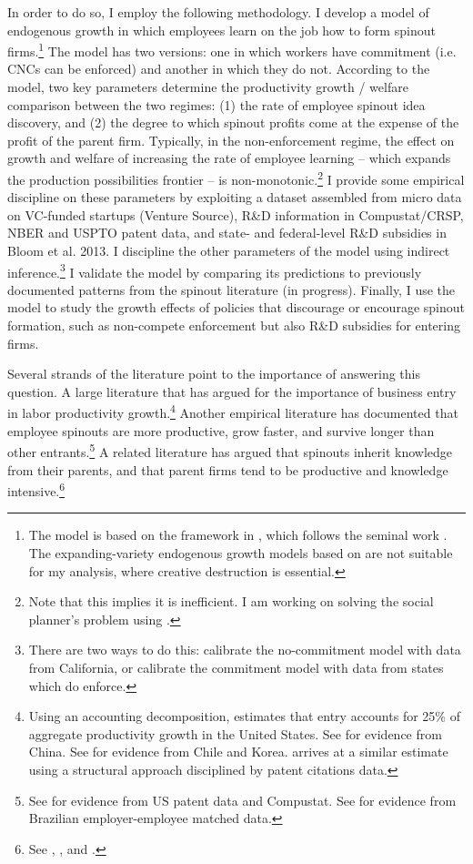\documentclass[12pt,english]{article}
\theoremstyle{remark}
\begin{document}
In order to do so, I employ the following methodology. I develop a model of endogenous growth in which employees learn on the job how to form spinout firms.\footnote{The model is based on the framework in \cite{akcigit_growth_2018}, which follows the seminal work \cite{grossman_quality_1991}. The expanding-variety endogenous growth models based on \cite{romer_increasing_1986} are not suitable for my analysis, where creative destruction is essential.} The model has two versions: one in which workers have commitment (i.e. CNCs can be enforced) and another in which they do not. According to the model, two key parameters determine the productivity growth / welfare comparison between the two regimes: (1) the rate of employee spinout idea discovery, and (2) the degree to which spinout profits come at the expense of the profit of the parent firm. Typically, in the non-enforcement regime, the effect on growth and welfare of increasing the rate of employee learning -- which expands the production possibilities frontier -- is non-monotonic.\footnote{Note that this implies it is inefficient. I am working on solving the social planner's problem using \cite{nuno_social_2018}.} I provide some empirical discipline on these parameters by exploiting a dataset assembled from micro data on VC-funded startups (Venture Source), R\&D information in Compustat/CRSP, NBER and USPTO patent data, and state- and federal-level R\&D subsidies in Bloom et al. 2013. I discipline the other parameters of the model using indirect inference.\footnote{There are two ways to do this: calibrate the no-commitment model with data from California, or calibrate the commitment model with data from states which do enforce.} I validate the model by comparing its predictions to previously documented patterns from the spinout literature (in progress). Finally, I use the model to study the growth effects of policies that discourage or encourage spinout formation, such as non-compete enforcement but also R\&D subsidies for entering firms.

Several strands of the literature point to the importance of answering this question. A large literature that has argued for the importance of business entry in labor productivity growth.\footnote{Using an accounting decomposition, \cite{foster_aggregate_2001} estimates that entry accounts for 25\% of aggregate productivity growth in the United States. See \cite{brandt_creative_2012} for evidence from China. See \cite{asturias_firm_2019} for evidence from Chile and Korea. \cite{akcigit_growth_2018} arrives at a similar estimate using a structural approach disciplined by patent citations data.} Another empirical literature has documented that employee spinouts are more productive, grow faster, and survive longer than other entrants.\footnote{See \cite{baslandze_spinout_2019} for evidence from US patent data and Compustat. See \cite{muendler_employee_2012} for evidence from Brazilian employer-employee matched data.} A related literature has argued that spinouts inherit knowledge from their parents, and that parent firms tend to be productive and knowledge intensive.\footnote{See \cite{klepper_entry_2005}, \cite{gompers_entrepreneurial_2005}, and \cite{baslandze_spinout_2019}.} 
\end{document}
